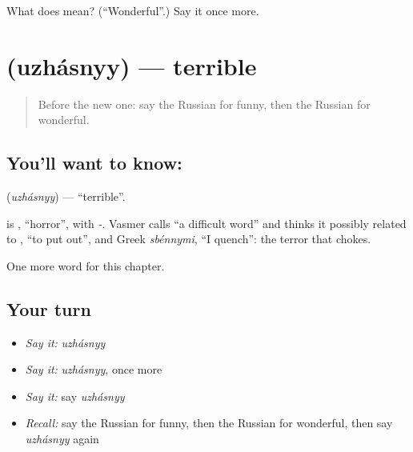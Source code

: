 \begin{tcolorbox}[breakable,colback=teal!4,colframe=teal!35!black,title={Before you move on}]
What does  mean? (\textquotedblleft{}Wonderful\textquotedblright{}.) Say it once more.
\end{tcolorbox}
\section[\texorpdfstring{\ru{ужасный} (uzhásnyy)}{ужасный (uzhásnyy)}]{ (uzhásnyy) — terrible}

\label{lesson:RU-C245-uzhasnyy}



\begin{quote}
Before the new one: say the Russian for funny, then the Russian for wonderful.
\end{quote}

\subsection*{You'll want to know: }
\textbf{} (\emph{uzhásnyy}) — \textquotedblleft{}terrible\textquotedblright{}.

\begin{cousinweb}
\textbf{} is \emph{}, \textquotedblleft{}horror\textquotedblright{}, with \emph{-}. Vasmer calls \emph{} \textquotedblleft{}a difficult word\textquotedblright{} and thinks it possibly related to \emph{}, \textquotedblleft{}to put out\textquotedblright{}, and Greek \emph{sbénnymi}, \textquotedblleft{}I quench\textquotedblright{}: the terror that chokes.
\end{cousinweb}

\begin{grammarlens}[title={What you've built}]
One more word for this chapter.
\end{grammarlens}

\subsection*{Your turn}
\begin{itemize}
\raggedright
  \item \emph{Say it:} \emph{uzhásnyy}
  \item \emph{Say it:} \emph{uzhásnyy}, once more
  \item \emph{Say it:} say \emph{uzhásnyy}
  \item \emph{Recall:} say the Russian for funny, then the Russian for wonderful, then say \emph{uzhásnyy} again
\end{itemize}

